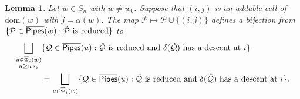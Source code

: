 \documentclass[12 pt]{amsart}
\newcommand{\dom}{\mathrm{dom}}
\newcommand{\addable}{\alpha}
\newtheorem{lemma}[Theorem]{Lemma}
\numberwithin{equation}{section}
\theoremstyle{remark}
\newcommand{\kpipes}{\overline{\sf Pipes}}
\newcommand{\demprod}{\delta}
\newcommand{\kcotransitionperms}{\overline{\Phi}}
\begin{document}
		\begin{lemma}
			\label{lemma:kcotransitionrestrictedbijection}
			Let $w \in S_n$ with $w \neq w_0$. 
			Suppose that $(i,j)$ is an addable cell of $\dom(w)$ with $j = \addable(w)$.
			The map $\mathcal{P} \mapsto \mathcal{P} \cup \{(i,j)\}$ defines a bijection from $\{\mathcal{P} \in \kpipes(w) : \check{\mathcal{P}} \text{ is reduced}\}$ to 
			\begin{align}
				\label{eq:bigunionintwoforms}
				\bigsqcup_{\substack{u \in \kcotransitionperms_i(w)\\u\geq ws_i}} &\{\mathcal{Q} \in \kpipes(u):\check {\mathcal{Q}} \text{ is reduced and } \demprod(\check{\mathcal{Q}}) \text{ has a descent at } i\}\\
				& = \bigsqcup_{u \in \kcotransitionperms_i(w)} \{\mathcal{Q} \in \kpipes(u):\check {\mathcal{Q}} \text{ is reduced and } \demprod(\check{\mathcal{Q}}) \text{ has a descent at } i\}. \nonumber
			\end{align}
		\end{lemma}
	
\end{document}
